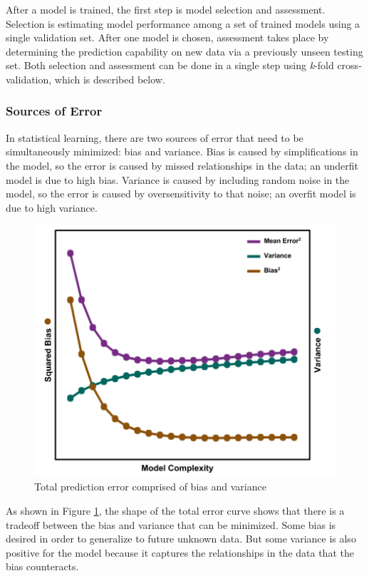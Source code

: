 After a model is trained, the first step is model selection and assessment.
Selection is estimating model performance among a set of trained models using a
single validation set.  After one model is chosen, assessment takes place by
determining the prediction capability on new data via a previously unseen
testing set. Both selection and assessment can be done in a single step using
\textit{k}-fold cross-validation, which is described below.

\subsubsection{Sources of Error} 

In statistical learning, there are two sources of error that need to be
simultaneously minimized: bias and variance. Bias is caused by simplifications
in the model, so the error is caused by missed relationships in the data; an
underfit model is due to high bias.  Variance is caused by including random
noise in the model, so the error is caused by oversensitivity to that noise; an
overfit model is due to high variance. 

\begin{figure}[!htb]
  \includegraphics[width=\linewidth]{./chapters/litrev/BVtradeoff.png}
  \caption{Total prediction error comprised of bias and variance}
  \label{fig:bvtradeoff}
\end{figure}

As shown in Figure \ref{fig:bvtradeoff}, the shape of the total error curve
shows that there is a tradeoff between the bias and variance that can be
minimized. Some bias is desired in order to generalize to future unknown data.
But some variance is also positive for the model because it captures the
relationships in the data that the bias counteracts. 

